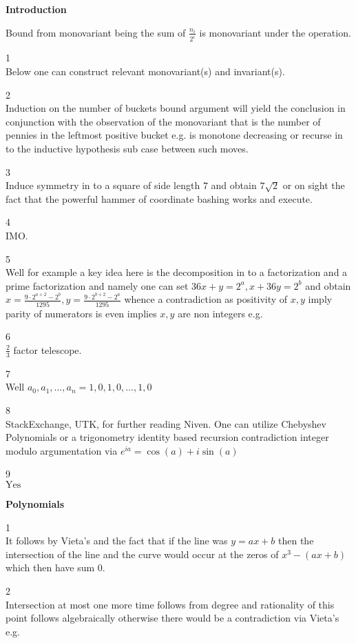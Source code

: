 \Large

\textbf{Introduction}

Bound from monovariant being the sum of $\frac{n_i}{2^i}$ is monovariant under the operation.

1 \\
Below one can construct relevant monovariant(s) and invariant(s).

2 \\
Induction on the number of buckets bound argument will yield the conclusion in conjunction with the observation of the monovariant that is the number of pennies in the leftmost positive bucket e.g. is monotone decreasing or recurse in to the inductive hypothesis sub case between such moves.

3 \\
Induce symmetry in to a square of side length $7$ and obtain $\boxed{7\sqrt{2}}$ or on sight the fact that the powerful hammer of coordinate bashing works and execute.

4 \\
IMO.

5 \\
Well for example a key idea here is the decomposition in to a factorization and a prime factorization and namely one can set $36x+y=2^a,x+36y=2^b$ and obtain $x=\frac{9 \cdot 2^{a+2}-2^b}{1295},y=\frac{9 \cdot 2^{b+2}-2^a}{1295}$ whence a contradiction as positivity of $x,y$ imply parity of numerators is even implies $x,y$ are non integers e.g.

6 \\
$\boxed{\frac{2}{3}}$ factor telescope.

7 \\
Well $\boxed{a_0,a_1,\dots,a_n=1,0,1,0,\dots,1,0}$

8 \\
StackExchange, UTK, for further reading Niven. One can utilize Chebyshev Polynomials or a trigonometry identity based recursion contradiction integer modulo argumentation via $e^{ia}=\cos(a)+i\sin(a)$

9 \\
$\boxed{\text{Yes}}$

\newpage

\textbf{Polynomials}

1 \\
It follows by Vieta's and the fact that if the line was $y=ax+b$ then the intersection of the line and the curve would occur at the zeros of $x^3-(ax+b)$ which then have sum $0$.

2 \\
Intersection at most one more time follows from degree and rationality of this point follows algebraically otherwise there would be a contradiction via Vieta's e.g.


